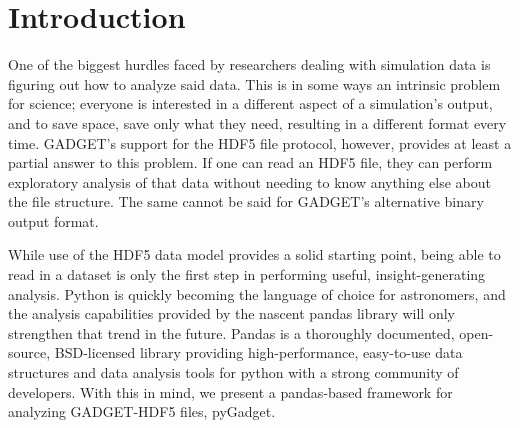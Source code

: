 \section{Introduction}
\label{intro}

One of the biggest hurdles faced by researchers dealing with simulation data is figuring out how to analyze said data.  This is in some ways an intrinsic problem for science; everyone is interested in a different aspect of a simulation’s output, and to save space, save only what they need, resulting in a different format every time.  GADGET’s support for the HDF5 file protocol, however, provides at least a partial answer to this problem.  If one can read an HDF5 file, they can perform exploratory analysis of that data without needing to know anything else about the file structure.  The same cannot be said for GADGET’s alternative binary output format.  

While use of the HDF5 data model provides a solid starting point, being able to read in a dataset is only the first step in performing useful, insight-generating analysis.  Python is quickly becoming the language of choice for astronomers, and the analysis capabilities provided by the nascent pandas library will only strengthen that trend in the future.  Pandas is a thoroughly documented, open-source, BSD-licensed library providing high-performance, easy-to-use data structures and data analysis tools for python with a strong community of developers. With this in mind, we present a pandas-based framework for analyzing GADGET-HDF5 files, pyGadget.
